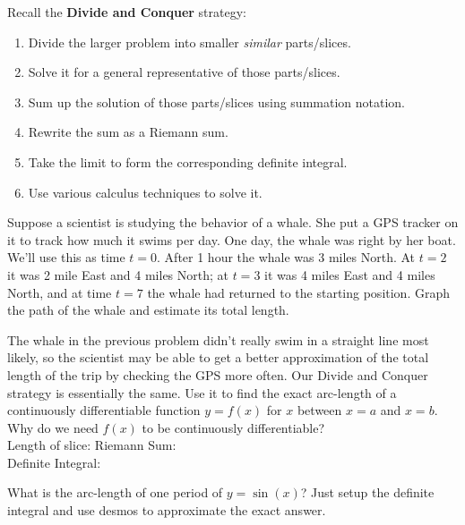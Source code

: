 \documentclass[answers]{exam}
\begin{document}
\begin{questions}
	
\question Recall the \textbf{Divide and Conquer} strategy:

\begin{enumerate}[Step 1.]
	\item Divide the larger problem into smaller \emph{similar} parts/slices.
	\item Solve it for a general representative of those parts/slices.
	\item Sum up the solution of those parts/slices using summation notation.
	\item Rewrite the sum as a Riemann sum.
	\item Take the limit to form the corresponding definite integral.
	\item Use various calculus techniques to solve it. 
\end{enumerate}


\question Suppose a scientist is studying the behavior of a whale. She put a GPS tracker on it to track how much it swims per day. One day, the whale was right by her boat. We'll use this as time $t=0$. After 1 hour the whale was 3 miles North. At $t = 2$ it was 2 mile East and 4 miles North; at $t = 3$ it was 4 miles East and 4 miles North, and at time $t = 7$ the whale had returned to the starting position. Graph the path of the whale and estimate its total length.

\hfill \break
\hfill \break
\hfill \break
\hfill \break
\hfill \break
\hfill \break
\hfill \break
\hfill \break
\hfill \break
\hfill \break
\hfill \break

\question The whale in the previous problem didn't really swim in a straight line most likely, so the scientist may be able to get a better approximation of the total length of the trip by checking the GPS more often. Our Divide and Conquer strategy is essentially the same. Use it to find the exact arc-length of a continuously differentiable function $y = f(x)$ for $x$ between $x = a$ and $x = b$. Why do we need $f(x)$ to be continuously differentiable?\\

Length of slice: \hspace{2in} Riemann Sum:\\

Definite Integral: \\

\newpage

\question What is the arc-length of one period of $y = \sin(x)$? Just setup the definite integral and use desmos to approximate the exact answer.


\end{questions}
\end{document}
